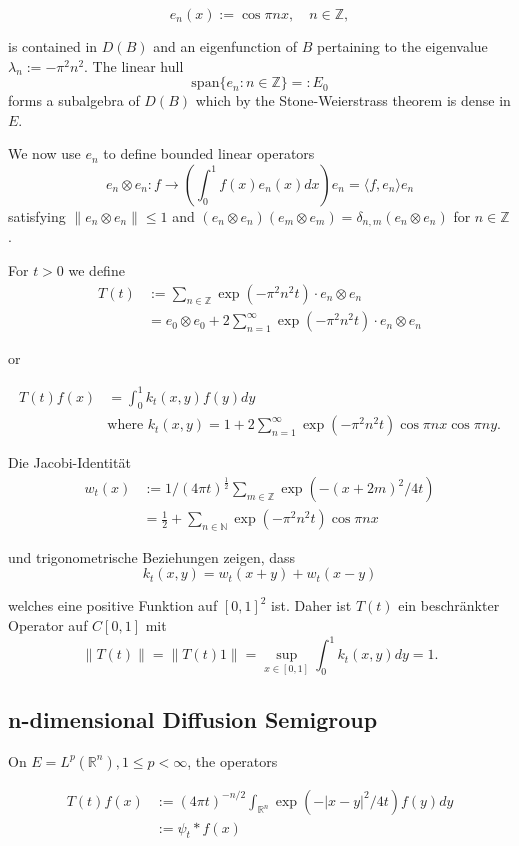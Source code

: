 \documentclass{article}
\begin{document}
\[
e_n(x) := \cos \pi nx, \quad n \in \mathbb{Z},
\]

is contained in $D(B)$ and an eigenfunction of $B$ pertaining to the eigenvalue $\lambda_n := -\pi^2n^2$.
The linear hull
\[
\text{span}\{e_n: n \in \mathbb{Z}\} =: E_0
\]
forms a subalgebra of $D(B)$ which by the Stone-Weierstrass theorem is dense in $E$.

We now use $e_n$ to define bounded linear operators
\[
e_n \otimes e_n: f \rightarrow \left(\int_0^1 f(x)e_n(x)dx\right)e_n = \langle f,e_n\rangle e_n
\]
satisfying $\|e_n \otimes e_n\| \leq 1$ and
$(e_n \otimes e_n)(e_m \otimes e_m) = \delta_{n,m}(e_n \otimes e_n)$ for $n \in \mathbb{Z}$.

For $t>0$ we define
\[
\begin{aligned}
T(t) &:= \sum_{n \in \mathbb{Z}} \exp(-\pi^2n^2t) \cdot e_n \otimes e_n \\
&= e_0 \otimes e_0 + 2\sum_{n=1}^{\infty} \exp(-\pi^2n^2t) \cdot e_n \otimes e_n
\end{aligned}
\]

or

\[
\begin{aligned}
T(t)f(x) &= \int_0^1 k_t(x,y)f(y)dy \\
&\text{where } k_t(x,y) = 1 + 2\sum_{n=1}^{\infty} \exp(-\pi^2n^2t)\cos \pi nx \cos \pi ny.
\end{aligned}
\]

Die Jacobi-Identität
\[
\begin{aligned}
w_t(x) &:= 1/(4\pi t)^{\frac{1}{2}} \sum_{m \in \mathbb{Z}} \exp(-(x+2m)^2/4t) \\
&= \frac{1}{2} + \sum_{n \in \mathbb{N}} \exp(-\pi^2n^2t)\cos \pi nx
\end{aligned}
\]

und trigonometrische Beziehungen zeigen, dass
\[
k_t(x,y) = w_t(x+y) + w_t(x-y)
\]

welches eine positive Funktion auf $[0,1]^2$ ist.
Daher ist $T(t)$ ein beschränkter Operator auf $C[0,1]$ mit
\[
\|T(t)\| = \|T(t)1\| = \sup_{x \in [0,1]} \int_0^1 k_t(x,y)dy = 1.
\]

\subsection{n-dimensional Diffusion Semigroup}
On $E=L^p(\mathbb{R}^n), 1 \leq p < \infty$, the operators

\[
\begin{aligned}
T(t)f(x) &:= (4\pi t)^{-n/2} \int_{\mathbb{R}^n} \exp(-|x-y|^2/4t)f(y)dy \\
&:= \psi_t * f(x)
\end{aligned}
\]
\end{document}
